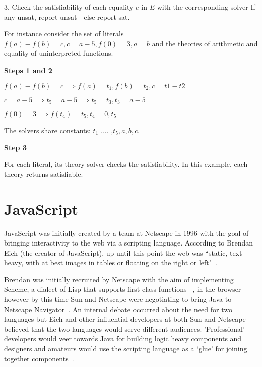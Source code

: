 \documentclass[]{final_report}
\begin{document}
3. Check the satisfiability of each equality $e$ in $E$ with the corresponding solver If any unsat, report unsat - else report sat.

For instance consider the set of literals $f(a) - f(b) = c, c = a -5, f(0) = 3, a = b$ and the theories of arithmetic and equality of uninterpreted functions.

\textbf{Steps 1 and 2}

$f(a) - f(b) = c \implies f(a) = t_1, f(b) = t_2, c = t1 - t2$

$c = a - 5 \implies t_5 = a - 5 \implies t_5 = t_3, t_3 = a- 5$

$f(0) =3 \implies f(t_4) = t_5, t_4 = 0, t_5$

The solvers share constants: $t_1$ .... ,$t_5, a, b, c$.

\textbf{Step 3}

For each literal, its theory solver checks the satisfiability. In this example, each theory returns satisfiable.

\chapter{JavaScript}

JavaScript was initially created by a team at Netscape in 1996 with the goal of bringing interactivity to the web via a scripting language. According to Brendan Eich (the creator of JavaScript), up until this point the web was ``static, text-heavy, with at best images in tables or floating on the right or left"~\cite{AZProgrammingLanguages}. 

Brendan was initially recruited by Netscape with the aim of implementing Scheme, a dialect of Lisp that supports first-class functions ~\cite{dybvig1996scheme}, in the browser however by this time Sun and Netscape were negotiating to bring Java to Netscape Navigator~\cite{popularityofjavascript}. An internal debate occurred about the need for two languages but Eich and other influential developers at both Sun and Netscape believed that the two languages would serve different audiences. 'Professional' developers would veer towards Java for building logic heavy components and designers and amateurs would use the scripting language as a `glue' for joining together components~\cite{AZProgrammingLanguages}.
\end{document}
